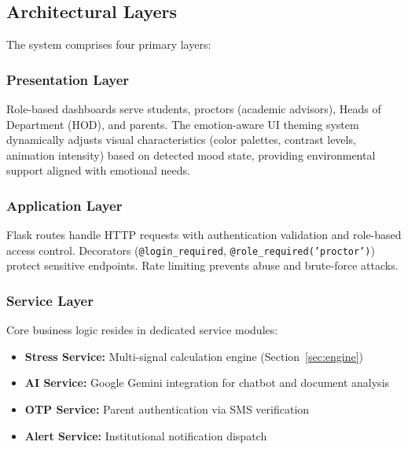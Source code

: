 \documentclass[journal]{IEEEtran}
\begin{document}
\subsection{Architectural Layers}

The system comprises four primary layers:

\subsubsection{Presentation Layer}
Role-based dashboards serve students, proctors (academic advisors), Heads of Department (HOD), and parents. The emotion-aware UI theming system dynamically adjusts visual characteristics (color palettes, contrast levels, animation intensity) based on detected mood state, providing environmental support aligned with emotional needs.

\subsubsection{Application Layer}
Flask routes handle HTTP requests with authentication validation and role-based access control. Decorators (\texttt{@login\_required}, \texttt{@role\_required('proctor')}) protect sensitive endpoints. Rate limiting prevents abuse and brute-force attacks.

\subsubsection{Service Layer}
Core business logic resides in dedicated service modules:
\begin{itemize}
    \item \textbf{Stress Service:} Multi-signal calculation engine (Section~\ref{sec:engine})
    \item \textbf{AI Service:} Google Gemini integration for chatbot and document analysis
    \item \textbf{OTP Service:} Parent authentication via SMS verification
    \item \textbf{Alert Service:} Institutional notification dispatch
\end{itemize}
\end{document}
